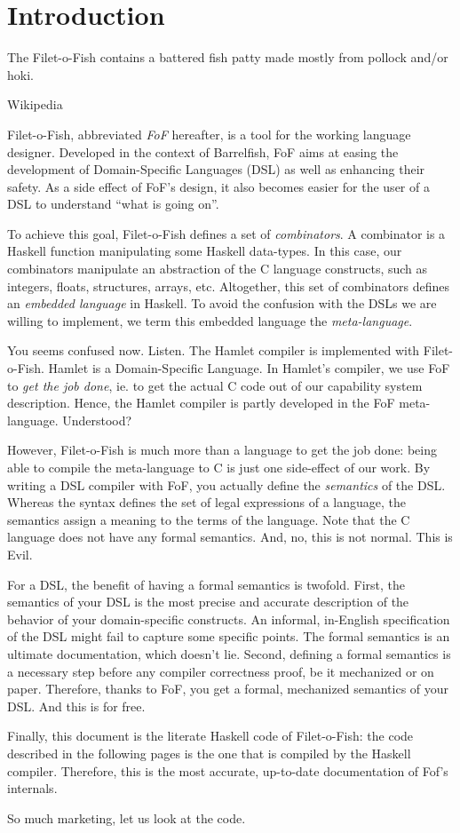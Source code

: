 \chapter*{Introduction}
\epigraph{The Filet-o-Fish contains a battered fish patty made mostly
          from pollock and/or hoki.}{Wikipedia}


Filet-o-Fish, abbreviated \emph{FoF} hereafter, is a tool for the
working language designer. Developed in the context of
Barrelfish\cite{schuepbach:mmcs08}, FoF aims at easing the development
of Domain-Specific Languages (DSL) as well as enhancing their
safety. As a side effect of FoF's design, it also becomes easier for
the user of a DSL to understand ``what is going on''.

To achieve this goal, Filet-o-Fish defines a set of
\emph{combinators}. A combinator is a Haskell function manipulating
some Haskell data-types. In this case, our combinators manipulate an
abstraction of the C language constructs, such as integers, floats,
structures, arrays, etc. Altogether, this set of combinators defines
an \emph{embedded language} in Haskell. To avoid the confusion with
the DSLs we are willing to implement, we term this embedded language
the \emph{meta-language}. 

You seems confused now. Listen. The Hamlet compiler is implemented
with Filet-o-Fish. Hamlet is a Domain-Specific Language. In Hamlet's
compiler, we use FoF to \emph{get the job done}, ie. to get the actual
C code out of our capability system description. Hence, the Hamlet
compiler is partly developed in the FoF meta-language. Understood?

However, Filet-o-Fish is much more than a language to get the job
done: being able to compile the meta-language to C is just one
side-effect of our work. By writing a DSL compiler with FoF, you
actually define the \emph{semantics} of the DSL. Whereas the syntax
defines the set of legal expressions of a language, the semantics
assign a meaning to the terms of the language. Note that the C
language does not have any formal semantics. And, no, this is not
normal. This is Evil.

For a DSL, the benefit of having a formal semantics is twofold. First,
the semantics of your DSL is the most precise and accurate description
of the behavior of your domain-specific constructs. An informal,
in-English specification of the DSL might fail to capture some
specific points. The formal semantics is an ultimate documentation,
which doesn't lie. Second, defining a formal semantics is a necessary
step before any compiler correctness proof, be it mechanized or on
paper. Therefore, thanks to FoF, you get a formal, mechanized
semantics of your DSL. And this is for free.

Finally, this document is the literate Haskell code of Filet-o-Fish:
the code described in the following pages is the one that is compiled
by the Haskell compiler. Therefore, this is the most accurate,
up-to-date documentation of Fof's internals.

So much marketing, let us look at the code.

